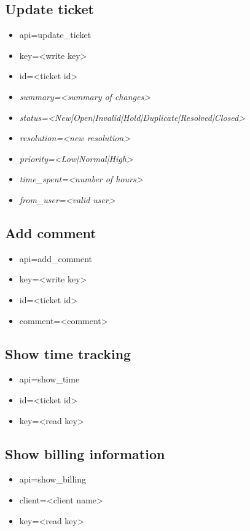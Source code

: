 \documentclass[11pt]{article}
\begin{document}
\subsection{Update ticket}

\begin{itemize}
\item api=update\_ticket
\item key=<write key>
\item id=<ticket id>
\item \textit{summary=<summary of changes>}
\item \textit{status=<New|Open|Invalid|Hold|Duplicate|Resolved|Closed>}
\item \textit{resolution=<new resolution>}
\item \textit{priority=<Low|Normal|High>}
\item \textit{time\_spent=<number of hours>}
\item \textit{from\_user=<valid user>}
\end{itemize}

\subsection{Add comment}

\begin{itemize}
\item api=add\_comment
\item key=<write key>
\item id=<ticket id>
\item comment=<comment>
\end{itemize}

\subsection{Show time tracking}

\begin{itemize}
\item api=show\_time
\item id=<ticket id>
\item key=<read key>
\end{itemize}

\subsection{Show billing information}

\begin{itemize}
\item api=show\_billing
\item client=<client name>
\item key=<read key>
\end{itemize}
\end{document}
